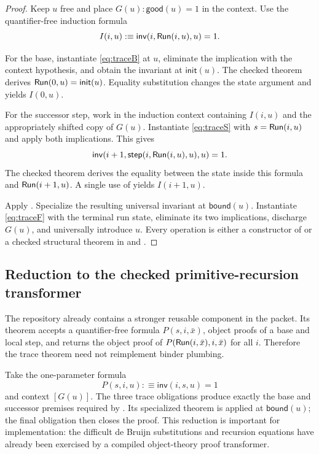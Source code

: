 \begin{proof}
Keep \(u\) free and place \(G(u):\mathsf{good}(u)=1\) in the context.  Use the
quantifier-free induction formula
\[
  I(i,u):\equiv
  \mathsf{inv}(i,\mathsf{Run}(i,u),u)=1.
\]

For the base, instantiate \eqref{eq:traceB} at \(u\), eliminate the implication
with the context hypothesis, and obtain the invariant at
\(\mathsf{init}(u)\).  The checked theorem  derives
\(\mathsf{Run}(0,u)=\mathsf{init}(u)\).  Equality substitution changes the state
argument and yields \(I(0,u)\).

For the successor step, work in the induction context containing \(I(i,u)\)
and the appropriately shifted copy of \(G(u)\).  Instantiate
\eqref{eq:traceS} with \(s=\mathsf{Run}(i,u)\) and apply both implications.  This gives
\[
 \mathsf{inv}(i+1,\mathsf{step}(i,\mathsf{Run}(i,u),u),u)=1.
\]
The checked theorem  derives the equality between the state
inside this formula and \(\mathsf{Run}(i+1,u)\).  A single use of
 yields \(I(i+1,u)\).

Apply .  Specialize the resulting universal invariant at
\(\mathsf{bound}(u)\).  Instantiate \eqref{eq:traceF} with the terminal run
state, eliminate its two implications, discharge \(G(u)\), and universally
introduce \(u\).  Every operation is either a constructor of  or a
checked structural theorem in  and .
\end{proof}

\subsection{Reduction to the checked primitive-recursion transformer}

The repository already contains a stronger reusable component in the
 packet.  Its theorem
 accepts a quantifier-free formula
\(P(s,i,\bar x)\), object proofs of a base and local step, and returns the
object proof of \(P(\mathsf{Run}(i,\bar x),i,\bar x)\) for all \(i\).  Therefore the
trace theorem need not reimplement binder plumbing.

Take the one-parameter formula
\[
  P(s,i,u):\equiv\mathsf{inv}(i,s,u)=1
\]
and context \([G(u)]\).  The three trace obligations produce exactly the base
and successor premises required by .  Its
specialized theorem  is applied at
\(\mathsf{bound}(u)\); the final obligation then closes the proof.  This
reduction is important for implementation: the difficult de Bruijn
substitutions and recursion equations have already been exercised by a compiled
object-theory proof transformer.

